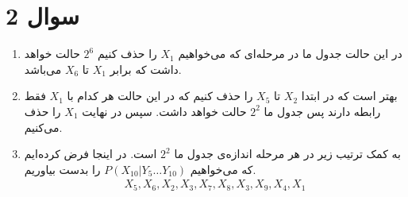 \section*{سوال 2}
\begin{enumerate}
    \item در این حالت جدول ما در مرحله‌ای که می‌خواهیم
    $X_1$
    را حذف کنیم
    $2^6$
    حالت خواهد داشت که برابر
    $X_1$ تا $X_6$
    می‌باشد.
    \item بهتر است که در ابتدا
    $X_2$ تا $X_5$
    را حذف کنیم که در این حالت هر کدام با
    $X_1$
    فقط رابطه دارند پس جدول ما
    $2^2$
    حالت خواهد داشت.
    سپس در نهایت
    $X_1$
    را حذف می‌کنیم.
    \item به کمک ترتیب زیر در هر مرحله اندازه‌ی جدول ما
    $2^2$
    است. در اینجا فرض کرده‌ایم که می‌خواهیم
    $P(X_{10}| Y_5 \dots Y_{10})$
    را بدست بیاوریم.
    \begin{gather*}
        X_5, X_6, X_2, X_3, X_7, X_8, X_3, X_9, X_4, X_1
    \end{gather*}
\end{enumerate}